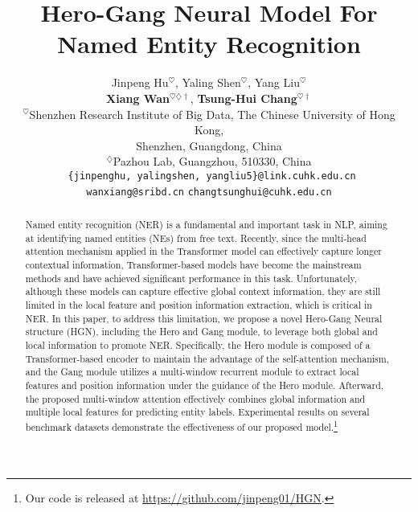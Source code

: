 \documentclass[11pt]{article}
\title{Hero-Gang Neural Model For Named Entity Recognition}
\author{Jinpeng Hu$^{\heartsuit}$, \hspace{0.2cm}
Yaling Shen$^{\heartsuit}$, \hspace{0.2cm}
Yang Liu$^{\heartsuit}$ \hspace{0.2cm} \\
 \textbf{Xiang Wan}$^{\heartsuit\diamondsuit\dag}$, \hspace{0.2cm} \textbf{Tsung-Hui Chang}$^{\heartsuit\dag}$ \\
$^{\heartsuit}$Shenzhen Research Institute of Big Data, The Chinese University of Hong Kong, \\Shenzhen, Guangdong, China \hspace{0.2cm} \\
$^{\diamondsuit}$Pazhou Lab, Guangzhou, 510330, China \hspace{0.2cm} \\
\texttt{
\{jinpenghu, yalingshen, yangliu5\}@link.cuhk.edu.cn} \\
\texttt{wanxiang@sribd.cn} \hspace{0.2cm}
\texttt{changtsunghui@cuhk.edu.cn}
}
\begin{document}
\maketitle

\def\thefootnote{\dag}
\renewcommand{\thefootnote}{\arabic{footnote}}

\begin{abstract}
Named entity recognition (NER) is a fundamental and important task in NLP, aiming at identifying named entities (NEs) from free text. Recently, since the multi-head attention mechanism applied in the Transformer model can effectively capture longer contextual information, Transformer-based models have become the mainstream methods and have achieved significant performance in this task. Unfortunately, although these models can capture effective global context information, they are still limited in the local feature and position information extraction, which is critical in NER. In this paper, to address this limitation, we propose a novel Hero-Gang Neural structure (HGN), including the Hero and Gang module, to leverage both global and local information to promote NER. Specifically, the Hero module is composed of a Transformer-based encoder to maintain the advantage of the self-attention mechanism, and the Gang module utilizes a multi-window recurrent module to extract local features and position information under the guidance of the Hero module. Afterward, the proposed multi-window attention effectively combines global information and multiple local features for predicting entity labels. Experimental results on several benchmark datasets demonstrate the effectiveness of our proposed model.\footnote{Our code is released at \url{https://github.com/jinpeng01/HGN}.}
\end{abstract}
\end{document}
